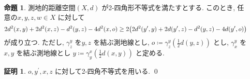 \documentclass[10pt, fleqn, label-section=none]{bxjsarticle}
\theoremstyle{definition}
\newtheorem{prop}[dfn]{命題}
\newtheorem*{pf*}{証明}
\newcommand{\paren}[1]{\mleft( #1\mright )}
\renewcommand{\;}{\, ; \,}
\begin{document}
\begin{prop}測地的距離空間$(X, d)$ が2-四角形不等式を満たすとする. このとき, 任意の$x, y, z, w \in X$ に対して
\begin{align*} 2d^2(x, y) + 2d^2(x, z) - d^2(y, z) - 4d^2(x, o) \geq 2\paren{2d^2(y^\prime, y) + 2d(y^\prime, z) - d^2(y, z) - 4d(y^\prime , o)}                    \end{align*}
が成り立つ. ただし, $\gamma_z^y$ を$y, z$ を結ぶ測地線とし, $o \coloneqq \gamma_z^y (\frac{1}{2} d(y, z))$ とし, $\gamma_x^y$ を$x, y$ を結ぶ測地線とし $y \coloneqq \gamma_y^x (\frac{1}{2} d(x, y))$ と定める. 
\end{prop}
\begin{pf*}
$o, y^\prime, x, z$ に対して2-四角不等式を用いる. 
\qed
\end{pf*}
\end{document}

